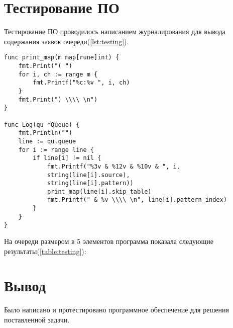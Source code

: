 \section{Тестирование ПО}
Тестирование ПО проводилось написанием журналирования для вывода содержания заявок очереди(\ref{lst:testing}).
\begin{lstlisting}[label=lst:testing,caption=Тестирование ПО]
func print_map(m map[rune]int) {
	fmt.Print("( ")
	for i, ch := range m {
		fmt.Printf("%c:%v ", i, ch)
	}
	fmt.Print(") \\\\ \n")
}

func Log(qu *Queue) {
	fmt.Println("")
	line := qu.queue
	for i := range line {
		if line[i] != nil {
			fmt.Printf("%3v & %12v & %10v & ", i, 
			string(line[i].source),
			string(line[i].pattern))
			print_map(line[i].skip_table)
			fmt.Printf(" & %v \\\\ \n", line[i].pattern_index)
		}
	}
}
\end{lstlisting}
На очереди размером в 5 элементов программа показала следующие результаты(\ref{table:testing}):
\begin{table}[H]
	\captionsetup{singlelinecheck = false, justification=raggedleft}
	\renewcommand{\arraystretch}{1.8}
	\caption{Тестирование ПО}
	\label{table:testing}
\end{table}

\section{Вывод}
Было написано и протестировано программное обеспечение для решения поставленной задачи. 